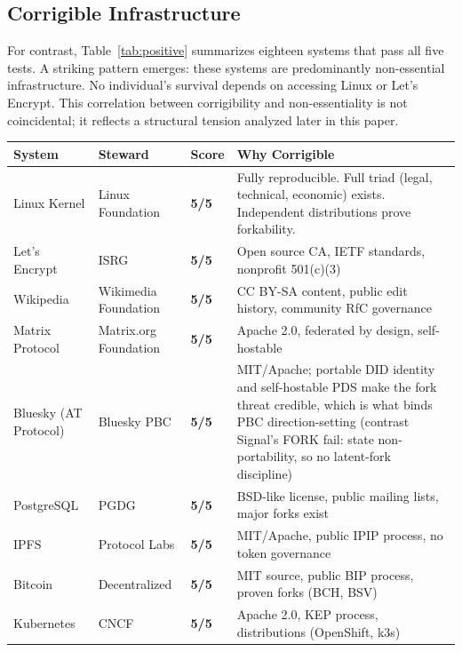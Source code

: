 \documentclass{article}
\begin{document}
\subsection{Corrigible Infrastructure}

For contrast, Table~\ref{tab:positive} summarizes eighteen systems that pass all five tests. A striking pattern emerges: these systems are predominantly non-essential infrastructure. No individual's survival depends on accessing Linux or Let's Encrypt. This correlation between corrigibility and non-essentiality is not coincidental; it reflects a structural tension analyzed later in this paper.

\begin{table}[htbp]
\centering
\small
\renewcommand{\arraystretch}{1.3}
\begin{tabular}{@{}l>{\raggedright}p{3.2cm}>{\centering\arraybackslash}p{1.2cm}p{5.8cm}@{}}
\toprule
\rowcolor{gray!15}
\textbf{System} & \textbf{Steward} & \textbf{Score} & \textbf{Why Corrigible} \\
\midrule
\rowcolor{green!8}
Linux Kernel & Linux Foundation & \textbf{5/5} & Fully reproducible. Full triad (legal, technical, economic) exists. Independent distributions prove forkability. \\
Let's Encrypt & ISRG & \textbf{5/5} & Open source CA, IETF standards, nonprofit 501(c)(3) \\
\rowcolor{green!8}
Wikipedia & Wikimedia Foundation & \textbf{5/5} & CC BY-SA content, public edit history, community RfC governance \\
Matrix Protocol & Matrix.org Foundation & \textbf{5/5} & Apache 2.0, federated by design, self-hostable \\
\rowcolor{green!8}
Bluesky (AT Protocol) & Bluesky PBC & \textbf{5/5} & MIT/Apache; portable DID identity and self-hostable PDS make the fork threat credible, which is what binds PBC direction-setting (contrast Signal's FORK fail: state non-portability, so no latent-fork discipline) \\
PostgreSQL & PGDG & \textbf{5/5} & BSD-like license, public mailing lists, major forks exist \\
\rowcolor{green!8}
IPFS & Protocol Labs & \textbf{5/5} & MIT/Apache, public IPIP process, no token governance \\
Bitcoin & Decentralized & \textbf{5/5} & MIT source, public BIP process, proven forks (BCH, BSV) \\
\rowcolor{green!8}
Kubernetes & CNCF & \textbf{5/5} & Apache 2.0, KEP process, distributions (OpenShift, k3s) \\

\end{tabular}
\end{table}
\end{document}
